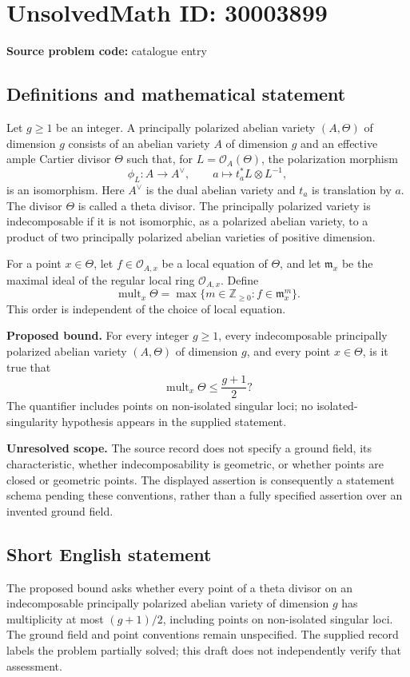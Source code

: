 \documentclass[11pt]{article}
\newcommand{\Z}{\mathbb{Z}}
\begin{document}
\section*{UnsolvedMath ID: 30003899}
\textbf{Source problem code:} catalogue entry
\subsection{Definitions and mathematical statement}
Let \(g\geq 1\) be an integer. A principally polarized abelian variety \((A,\Theta)\) of dimension \(g\) consists of an abelian variety \(A\) of dimension \(g\) and an effective ample Cartier divisor \(\Theta\) such that, for \(L=\mathcal O_A(\Theta)\), the polarization morphism
\[
\phi_L:A\longrightarrow A^\vee,\qquad a\longmapsto t_a^*L\otimes L^{-1},
\]
is an isomorphism. Here \(A^\vee\) is the dual abelian variety and \(t_a\) is translation by \(a\). The divisor \(\Theta\) is called a theta divisor. The principally polarized variety is indecomposable if it is not isomorphic, as a polarized abelian variety, to a product of two principally polarized abelian varieties of positive dimension.

For a point \(x\in\Theta\), let \(f\in\mathcal O_{A,x}\) be a local equation of \(\Theta\), and let \(\mathfrak m_x\) be the maximal ideal of the regular local ring \(\mathcal O_{A,x}\). Define
\[
\operatorname{mult}_x\Theta
=\max\{m\in\Z_{\geq 0}:f\in\mathfrak m_x^m\}.
\]
This order is independent of the choice of local equation.

\textbf{Proposed bound.} For every integer \(g\geq1\), every indecomposable principally polarized abelian variety \((A,\Theta)\) of dimension \(g\), and every point \(x\in\Theta\), is it true that
\[
\operatorname{mult}_x\Theta\leq\frac{g+1}{2}?
\]
The quantifier includes points on non-isolated singular loci; no isolated-singularity hypothesis appears in the supplied statement.

\textbf{Unresolved scope.} The source record does not specify a ground field, its characteristic, whether indecomposability is geometric, or whether points are closed or geometric points. The displayed assertion is consequently a statement schema pending these conventions, rather than a fully specified assertion over an invented ground field.
\subsection{Short English statement}
The proposed bound asks whether every point of a theta divisor on an indecomposable principally polarized abelian variety of dimension \(g\) has multiplicity at most \((g+1)/2\), including points on non-isolated singular loci. The ground field and point conventions remain unspecified. The supplied record labels the problem partially solved; this draft does not independently verify that assessment.
\end{document}
